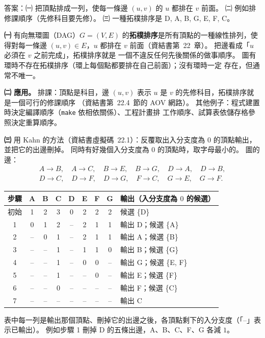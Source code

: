 \begin{pastsoln}
答案：㈠ 把頂點排成一列，使每一條邊 $(u, v)$ 的 $u$ 都排在 $v$ 前面。 ㈡ 例如排修課順序（先修科目要先修）。
㈢ 一種拓樸排序是 D, A, B, G, E, F, C。

\textbf{㈠} 有向無環圖（DAG）$G = (V, E)$ 的\textbf{拓樸排序}是所有頂點的一種線性排列，使得對每一條邊
$(u, v) \in E$，$u$ 都排在 $v$ 前面（資結書第~22~章）。 把邊看成「$u$ 必須在 $v$ 之前完成」，拓樸排序就是
一個不違反任何先後關係的做事順序。 圖有環時不存在拓樸排序（環上每個點都要排在自己前面）；沒有環時一定
存在，但通常不唯一。

\textbf{㈡ 應用。} 排課：頂點是科目，邊 $(u, v)$ 表示 $u$ 是 $v$ 的先修科目，拓樸排序就是一個可行的修課順序
（資結書第~22.4~節的 AOV 網路）。 其他例子：程式建置時決定編譯順序（\texttt{make} 依相依關係）、工程計畫排
工作順序、試算表依儲存格參照決定重算順序。

\textbf{㈢} 用 Kahn 的方法（資結書虛擬碼~22.1）：反覆取出入分支度為 $0$ 的頂點輸出，並把它的出邊刪掉。
同時有好幾個入分支度為 $0$ 的頂點時，取字母最小的。 圖的邊：
\[
\begin{gathered}
A\to B,\quad A \to C,\quad B \to E,\quad B \to G,\quad D \to A,\quad D \to B, \\
D \to C,\quad D \to F,\quad D \to G,\quad F \to C,\quad G \to E,\quad G \to F.
\end{gathered}
\]
\begin{center}
\small
\begin{tabular}{c*{7}{c}l}
\toprule
步驟 & A & B & C & D & E & F & G & 輸出（入分支度為 $0$ 的候選） \\
\midrule
初始 & 1 & 2 & 3 & 0 & 2 & 2 & 2 & 候選 \{D\} \\
1 & 0 & 1 & 2 & -- & 2 & 1 & 1 & 輸出 D；候選 \{A\} \\
2 & -- & 0 & 1 & -- & 2 & 1 & 1 & 輸出 A；候選 \{B\} \\
3 & -- & -- & 1 & -- & 1 & 1 & 0 & 輸出 B；候選 \{G\} \\
4 & -- & -- & 1 & -- & 0 & 0 & -- & 輸出 G；候選 \{E, F\} \\
5 & -- & -- & 1 & -- & -- & 0 & -- & 輸出 E；候選 \{F\} \\
6 & -- & -- & 0 & -- & -- & -- & -- & 輸出 F；候選 \{C\} \\
7 & -- & -- & -- & -- & -- & -- & -- & 輸出 C \\
\bottomrule
\end{tabular}
\end{center}
表中每一列是輸出那個頂點、刪掉它的出邊之後，各頂點剩下的入分支度（「--」表示已輸出）。 例如步驟 1 刪掉
D 的五條出邊，A、B、C、F、G 各減 $1$。


\end{pastsoln}
